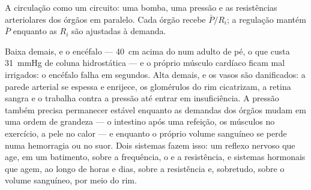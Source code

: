 \begin{omfigure}

{\small A circulação como um circuito: uma bomba, uma pressão e as
resistências arteriolares dos órgãos em paralelo. Cada órgão recebe
$\bar P/R_i$; a regulação mantém $\bar P$ enquanto as $R_i$ são
ajustadas à demanda.}
\end{omfigure}

\begin{proposition}\label{prop:b2:blood-pressure:why}
Baixa demais, e o encéfalo --- \qty{40}{cm} acima do  num adulto de
pé, o que custa \qty{31}{mmHg} de coluna hidrostática --- e o próprio
músculo cardíaco ficam mal irrigados: o encéfalo falha em segundos. Alta
demais, e os vasos são danificados: a parede arterial se espessa e
enrijece, os glomérulos do rim cicatrizam, a retina sangra e o 
trabalha contra a pressão até entrar em insuficiência. A pressão também
precisa permanecer estável enquanto as demandas dos órgãos mudam em uma
ordem de grandeza --- o intestino após uma refeição, os músculos no
exercício, a pele no calor --- e enquanto o próprio volume sanguíneo se
perde numa hemorragia ou no suor. Dois sistemas fazem isso: um reflexo
nervoso que age, em um batimento, sobre a frequência, o  e a resistência, e sistemas hormonais que agem, ao longo de
horas e dias, sobre a resistência e, sobretudo, sobre o volume
sanguíneo, por meio do rim.
\end{proposition}

